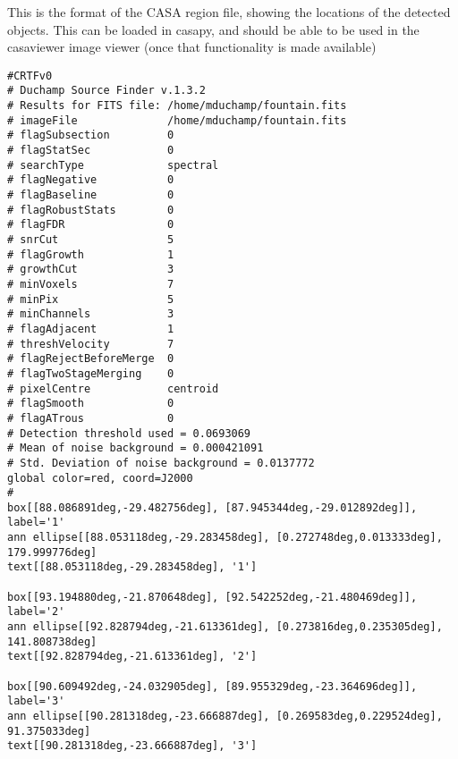 %
%
%
%
\label{app-casa}

This is the format of the CASA region file, showing the locations
of the detected objects. This can be loaded in casapy, and should be
able to be used in the casaviewer image viewer (once that
functionality is made available)

\begin{verbatim}
#CRTFv0
# Duchamp Source Finder v.1.3.2
# Results for FITS file: /home/mduchamp/fountain.fits
# imageFile              /home/mduchamp/fountain.fits
# flagSubsection         0
# flagStatSec            0
# searchType             spectral
# flagNegative           0
# flagBaseline           0
# flagRobustStats        0
# flagFDR                0
# snrCut                 5
# flagGrowth             1
# growthCut              3
# minVoxels              7
# minPix                 5
# minChannels            3
# flagAdjacent           1
# threshVelocity         7
# flagRejectBeforeMerge  0
# flagTwoStageMerging    0
# pixelCentre            centroid
# flagSmooth             0
# flagATrous             0
# Detection threshold used = 0.0693069
# Mean of noise background = 0.000421091
# Std. Deviation of noise background = 0.0137772
global color=red, coord=J2000 
#
box[[88.086891deg,-29.482756deg], [87.945344deg,-29.012892deg]], label='1'
ann ellipse[[88.053118deg,-29.283458deg], [0.272748deg,0.013333deg], 179.999776deg]
text[[88.053118deg,-29.283458deg], '1']

box[[93.194880deg,-21.870648deg], [92.542252deg,-21.480469deg]], label='2'
ann ellipse[[92.828794deg,-21.613361deg], [0.273816deg,0.235305deg], 141.808738deg]
text[[92.828794deg,-21.613361deg], '2']

box[[90.609492deg,-24.032905deg], [89.955329deg,-23.364696deg]], label='3'
ann ellipse[[90.281318deg,-23.666887deg], [0.269583deg,0.229524deg], 91.375033deg]
text[[90.281318deg,-23.666887deg], '3']
\end{verbatim}
